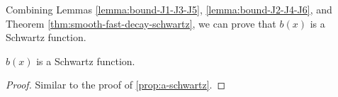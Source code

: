 
Combining Lemmas \ref{lemma:bound-J1-J3-J5}, \ref{lemma:bound-J2-J4-J6}, and Theorem \ref{thm:smooth-fast-decay-schwartz}, we can prove that $b(x)$ is a Schwartz function.

\begin{proposition}\label{prop:b-schwartz}\leanok
$b(x)$ is a Schwartz function.
\end{proposition}
\begin{proof}
Similar to the proof of \ref{prop:a-schwartz}.
\end{proof}



